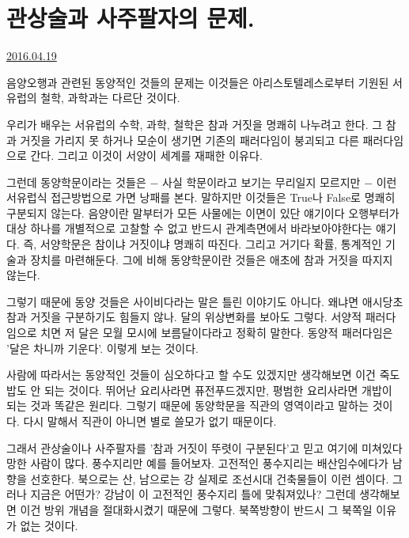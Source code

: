 \section{관상술과 사주팔자의 문제.}
\href{https://www.kockoc.com/Apoc/736121}{2016.04.19}

\vspace{5mm}

음양오행과 관련된 동양적인 것들의 문제는 이것들은 아리스토텔레스로부터 기원된 서유럽의 철학, 과학과는 다르단 것이다.
\vspace{5mm}

우리가 배우는 서유럽의 수학, 과학, 철학은 참과 거짓을 명쾌히 나누려고 한다.
그 참과 거짓을 가리지 못 하거나 모순이 생기면 기존의 패러다임이 붕괴되고 다른 패러다임으로 간다.
그리고 이것이 서양이 세계를 재패한 이유다.
\vspace{5mm}

그런데 동양학문이라는 것들은 $-$ 사실 학문이라고 보기는 무리일지 모르지만 $-$ 이런 서유럽식 접근방법으로 가면 낭패를 본다.
말하지만 이것들은 True나 False로 명쾌히 구분되지 않는다.
음양이란 말부터가 모든 사물에는 이면이 있단 얘기이다
오행부터가 대상 하나를 개별적으로 고찰할 수 없고 반드시 관계측면에서 바라보아야한다는 얘기다.
즉, 서양학문은 참이냐 거짓이냐 명쾌히 따진다. 그리고 거기다 확률, 통계적인 기술과 장치를 마련해둔다.
그에 비해 동양학문이란 것들은 애초에 참과 거짓을 따지지 않는다.
\vspace{5mm}

그렇기 때문에 동양 것들은 사이비다라는 말은 틀린 이야기도 아니다. 왜냐면 애시당초 참과 거짓을 구분하기도 힘들지 않나.
달의 위상변화를 보아도 그렇다.
서양적 패러다임으로 치면 저 달은 모월 모시에 보름달이다라고 정확히 말한다.
동양적 패러다임은 '달은 차니까 기운다'. 이렇게 보는 것이다.
\vspace{5mm}

사람에 따라서는 동양적인 것들이 심오하다고 할 수도 있겠지만 생각해보면 이건 죽도 밥도 안 되는 것이다.
뛰어난 요리사라면 퓨전푸드겠지만, 평범한 요리사라면 개밥이 되는 것과 똑같은 원리다.
그렇기 때문에 동양학문을 직관의 영역이라고 말하는 것이다. 다시 말해서 직관이 아니면 별로 쓸모가 없기 때문이다.
\vspace{5mm}

그래서 관상술이나 사주팔자를 '참과 거짓이 뚜렷이 구분된다'고 믿고 여기에 미쳐있다 망한 사람이 많다.
풍수지리만 예를 들어보자. 고전적인 풍수지리는 배산임수에다가 남향을 선호한다. 북으로는 산, 남으로는 강
실제로 조선시대 건축물들이 이런 셈이다.
그러나 지금은 어떤가? 강남이 이 고전적인 풍수지리 틀에 맞춰져있나?
그런데 생각해보면 이건 방위 개념을 절대화시켰기 때문에 그렇다. 북쪽방향이 반드시 그 북쪽일 이유가 없는 것이다.
\vspace{5mm}

